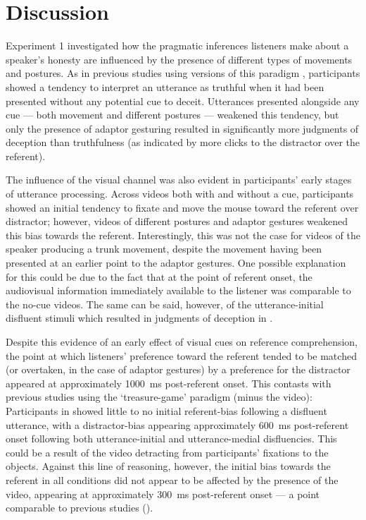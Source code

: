 \documentclass[a4paper,man,natbib]{apa6}
\begin{document}
\section{Discussion}
Experiment 1 investigated how the pragmatic inferences listeners make about a speaker's honesty are influenced by the presence of different types of movements and postures. 
As in previous studies using versions of this paradigm \citep{Loy2017, King2018}, participants showed a tendency to interpret an utterance as truthful when it had been presented without any potential cue to deceit.
Utterances presented alongside any cue --- both movement and different postures --- weakened this tendency, but only the presence of adaptor gesturing resulted in significantly more judgments of deception than truthfulness (as indicated by more clicks to the distractor over the referent).

The influence of the visual channel was also evident in participants' early stages of utterance processing. 
Across videos both with and without a cue, participants showed an initial tendency to fixate and move the mouse toward the referent over distractor; however, videos of different postures and adaptor gestures weakened this bias towards the referent.
Interestingly, this was not the case for videos of the speaker producing a trunk movement, despite the movement having been presented at an earlier point to the adaptor gestures.
One possible explanation for this could be due to the fact that at the point of referent onset, the audiovisual information immediately available to the listener was comparable to the no-cue videos. 
The same can be said, however, of the utterance-initial disfluent stimuli which resulted in judgments of deception in \citet{Loy2017}.

Despite this evidence of an early effect of visual cues on reference comprehension, the point at which listeners' preference toward the referent tended to be matched (or overtaken, in the case of adaptor gestures) by a preference for the distractor appeared at approximately 1000~ms post-referent onset. 
This contasts with previous studies using the `treasure-game' paradigm (minus the video): Participants in \citet{Loy2017} showed little to no initial referent-bias following a disfluent utterance, with a distractor-bias appearing approximately 600~ms post-referent onset following both utterance-initial and utterance-medial disfluencies. 
This could be a result of the video detracting from participants' fixations to the objects.
Against this line of reasoning, however, the initial bias towards the referent in all conditions did not appear to be affected by the presence of the video, appearing at approximately 300~ms post-referent onset --- a point comparable to previous studies (\citealt{Loy2017, King2018}).
\end{document}
